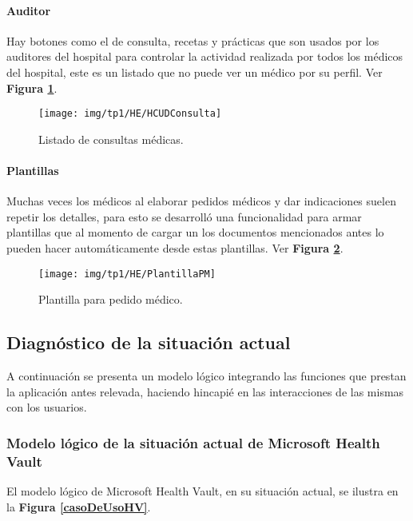 \paragraph{Auditor}

Hay botones como el de consulta, recetas y prácticas que son usados por los auditores del hospital para controlar la actividad realizada por todos los médicos del hospital, este es un listado que no puede ver un médico por su perfil. Ver \textbf{Figura \ref{consultas-auditor}}.


\begin{figure}[h]
      \centering
      \texttt{[image: img/tp1/HE/HCUDConsulta]}
      \caption{Listado de consultas médicas.}
      \label{consultas-auditor}
\end{figure}


\paragraph{Plantillas}

Muchas veces los médicos al elaborar pedidos médicos y dar indicaciones suelen repetir los detalles, para esto se desarrolló una funcionalidad para armar plantillas que al momento de cargar un los documentos mencionados antes lo pueden hacer automáticamente desde estas plantillas. Ver \textbf{Figura \ref{plantilla}}.


\begin{figure}[h]
      \centering
      \texttt{[image: img/tp1/HE/PlantillaPM]}
      \caption{Plantilla para pedido médico.}
      \label{plantilla}
\end{figure}

\subsection{Diagnóstico de la situación actual}
A continuación se presenta un modelo lógico integrando las funciones que prestan la aplicación antes relevada, haciendo hincapié en las interacciones de las mismas con los usuarios.


\subsubsection{Modelo lógico de la situación actual de Microsoft Health Vault}

El modelo lógico de Microsoft Health Vault, en su situación actual, se ilustra en la \textbf{Figura \ref{casoDeUsoHV}}.

